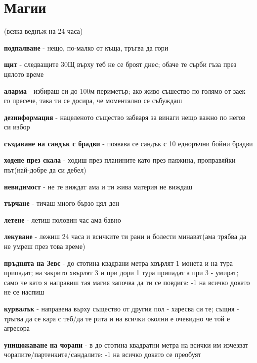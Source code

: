 \documentclass{article}
\newcommand{\spell}[2]{\textbf{#1} - #2  \par}
\begin{document}
\section{Магии}
(всяка веднъж на 24 часа)  \\
\par
\spell{подпалване}{нещо, по-малко от къща, тръгва да гори}
\spell{щит}{следващите 30Щ върху теб не се броят днес; обаче те сърби гъза през цялото време}
\spell{аларма}{избираш си до 100м периметър; ако живо съшество по-голямо от заек го пресече, така ти се досира, че моментално се събуждаш}
\spell{дезинформация}{нацеленото същество забваря за винаги нещо важно по негов си избор}
\spell{създаване на сандък с брадви}{появява се сандък с 10 едноръчни бойни брадви}
\spell{ходене през скала}{ходиш през планините като през паяжина, проправяйки път(най-добре да си дебел)}
\spell{невидимост}{не те виждат ама и ти жива материя не виждаш}
\spell{търчане}{тичаш много бързо цял ден}
\spell{летене}{летиш половин час ама бавно}
\spell{лекуване}{лежиш 24 часа и всичките ти рани и болести минават(ама трябва да не умреш през това време)}
\spell{пръднята на Зевс}{до стотина квадрани метра хвърлят 1 монета и на тура припадат; на закрито хвърлят 3 и при дори 1 тура припадат а при 3 - умират; само че като я направиш тая магия започва да ти се повдига: -1 на всичко докато не се наспиш}
\spell{курвалък}{направена върху същество от другия пол - харесва си те; същия - тръгва да се кара с теб/да те рита и на всички околни е очевидно че той е агресора}
\spell{унищожаване на чорапи}{в до стотина квадратни метра на всички им изчезват чорапите/партенките/сандалите: -1 на всичко докато се преобуят}
\end{document}

